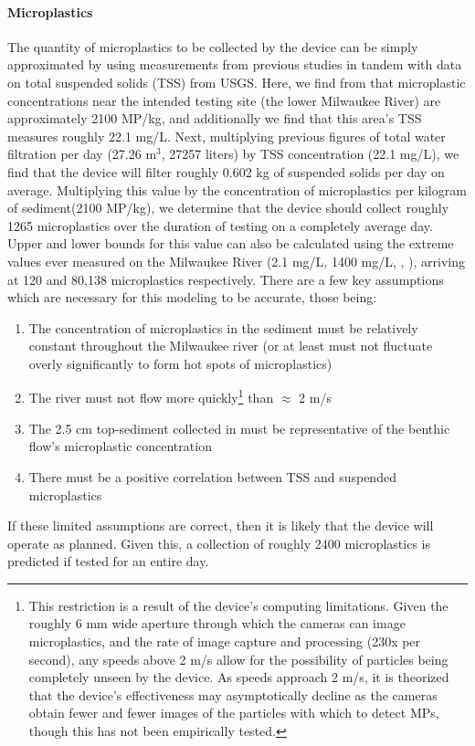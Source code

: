 \documentclass[fleqn,10pt]{SelfArx} %
\begin{document}
	\paragraph{Microplastics}
	The quantity of microplastics to be collected by the device can be simply approximated by using measurements from previous studies in tandem with data on total suspended solids (TSS) from USGS. Here, we find from \cite{LenakerEtAlvertdist} that microplastic concentrations near the intended testing site (the lower Milwaukee River) are approximately 2100 MP/kg, and additionally we find that this area's TSS measures roughly 22.1 mg/L. Next, multiplying previous figures of total water filtration per day (27.26 m$^3$, 27257 liters) by TSS concentration (22.1 mg/L), we find that the device will filter roughly 0.602 kg of suspended solids per day on average. Multiplying this value by the concentration of microplastics per kilogram of sediment(2100 MP/kg), we determine that the device should collect roughly 1265 microplastics over the duration of testing on a completely average day. Upper and lower bounds for this value can also be calculated using the extreme values ever measured on the Milwaukee River (2.1 mg/L, 1400 mg/L, \cite{USGSMil}, \cite{MKETSS}), arriving at 120 and 80,138 microplastics respectively. 
	\linebreak
	There are a few key assumptions which are necessary for this modeling to be accurate, those being:
	\begin{enumerate}
		\item The concentration of microplastics in the sediment must be relatively constant throughout the Milwaukee river (or at least must not fluctuate overly significantly to form hot spots of microplastics)
		\item The river must not flow more quickly\footnote{This restriction is a result of the device's computing limitations. Given the roughly 6 mm wide aperture through which the cameras can image microplastics, and the rate of image capture and processing (230x per second), any speeds above 2 m/s allow for the possibility of particles being completely unseen by the device. As speeds approach 2 m/s, it is theorized that the device's effectiveness may asymptotically decline as the cameras obtain fewer and fewer images of the particles with which to detect MPs, though this has not been empirically tested.} than $\approx$ 2 m/s
		\item The 2.5 cm top-sediment collected in \cite{LenakerEtAlvertdist} must be representative of the \gls{benthic} flow's microplastic concentration
		\item There must be a positive correlation between TSS and suspended microplastics
	\end{enumerate}
	If these limited assumptions are correct, then it is likely that the device will operate as planned. Given this, a collection of roughly 2400 microplastics is predicted if tested for an entire day.
	
\end{document}
